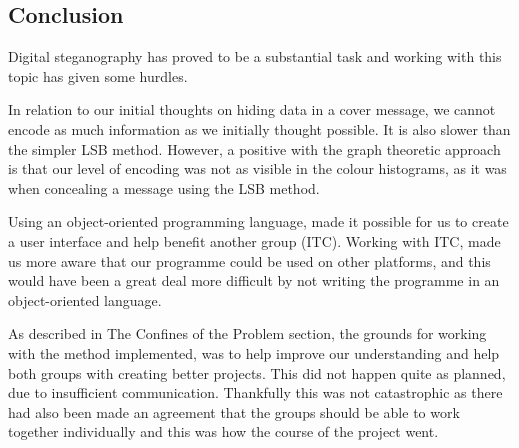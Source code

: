 \subsection{Conclusion}
Digital steganography has proved to be a substantial task and working with this topic has given some hurdles.
 
In relation to our initial thoughts on hiding data in a cover message, we cannot encode as much information as we initially thought possible. It is also slower than the simpler LSB method. However, a positive with the graph theoretic approach is that our level of encoding was not as visible in the colour histograms, as it was when concealing a message using the LSB method.

Using an object-oriented programming language, made it possible for us to create a user interface and help benefit another group (ITC). Working with ITC, made us more aware that our programme could be used on other platforms, and this would have been a great deal more difficult by not writing the programme in an object-oriented language. 

As described in The Confines of the Problem section, the grounds for working with the method implemented, was to help improve our understanding and help both groups with creating better projects. This did not happen quite as planned, due to insufficient communication. Thankfully this was not catastrophic as there had also been made an agreement that the groups should be able to work together individually and this was how the course of the project went.